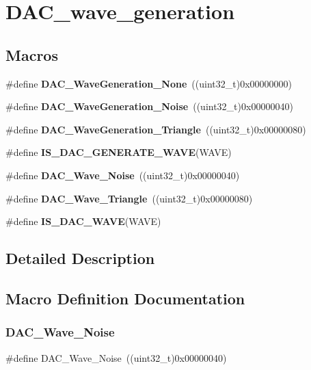 \section{D\+A\+C\+\_\+wave\+\_\+generation}
\label{group__DAC__wave__generation}
\subsection*{Macros}
\begin{DoxyCompactItemize}
\item 
\#define \textbf{ D\+A\+C\+\_\+\+Wave\+Generation\+\_\+\+None}~((uint32\+\_\+t)0x00000000)
\item 
\#define \textbf{ D\+A\+C\+\_\+\+Wave\+Generation\+\_\+\+Noise}~((uint32\+\_\+t)0x00000040)
\item 
\#define \textbf{ D\+A\+C\+\_\+\+Wave\+Generation\+\_\+\+Triangle}~((uint32\+\_\+t)0x00000080)
\item 
\#define \textbf{ I\+S\+\_\+\+D\+A\+C\+\_\+\+G\+E\+N\+E\+R\+A\+T\+E\+\_\+\+W\+A\+VE}(W\+A\+VE)
\item 
\#define \textbf{ D\+A\+C\+\_\+\+Wave\+\_\+\+Noise}~((uint32\+\_\+t)0x00000040)
\item 
\#define \textbf{ D\+A\+C\+\_\+\+Wave\+\_\+\+Triangle}~((uint32\+\_\+t)0x00000080)
\item 
\#define \textbf{ I\+S\+\_\+\+D\+A\+C\+\_\+\+W\+A\+VE}(W\+A\+VE)
\end{DoxyCompactItemize}


\subsection{Detailed Description}


\subsection{Macro Definition Documentation}
\mbox{\label{group__DAC__wave__generation_ga09c5ee68f8e726b1c039df1f6e195965}} 
\subsubsection{D\+A\+C\+\_\+\+Wave\+\_\+\+Noise}
{\footnotesize\ttfamily \#define D\+A\+C\+\_\+\+Wave\+\_\+\+Noise~((uint32\+\_\+t)0x00000040)}



